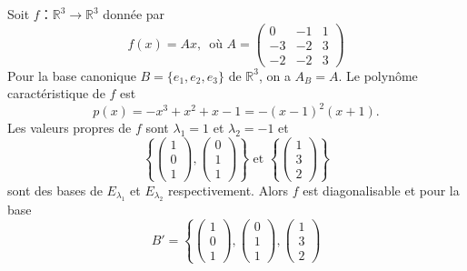 \begin{example}
  \label{exe:30}
  Soit $f： ℝ^3 → ℝ^3$ donnée par
  \begin{displaymath}
      f(x) = Ax, \, \text{ où }      A =  \begin{pmatrix}
        0 & -1 & 1 \\
        -3 & -2 & 3 \\
        -2 & -2 & 3
      \end{pmatrix}      
    \end{displaymath}
    Pour la base canonique  $B = \{e_1,e_2,e_3\}$ de $ℝ^3$, on a $A_B =A$. Le polynôme caractéristique de $f$ est
    \begin{displaymath}
      p(x) = -x^3 + x^2 + x -1 = - (x-1)^2 (x+1). 
    \end{displaymath}
    Les valeurs propres de $f$ sont $λ_1 = 1$ et $λ_2 = -1$ et
    \begin{displaymath}
      \left\{
          \begin{pmatrix}
            1 \\ 0 \\1
          \end{pmatrix},
          \begin{pmatrix}
            0 \\ 1 \\ 1
          \end{pmatrix} \right\} \text{ et }  \left\{
          \begin{pmatrix}
            1 \\ 3 \\2
          \end{pmatrix} \right\}
    \end{displaymath}
    sont des bases de $E_{λ_1}$ et  $E_{λ_2}$  respectivement. Alors $f$ est diagonalisable et pour la base
    \begin{displaymath}
      B' =  \left\{
          \begin{pmatrix}
            1 \\ 0 \\1
          \end{pmatrix},
          \begin{pmatrix}
            0 \\ 1 \\ 1
          \end{pmatrix}, 
          \begin{pmatrix}
            1 \\ 3 \\2

\end{pmatrix}
\end{displaymath}
\end{example}
